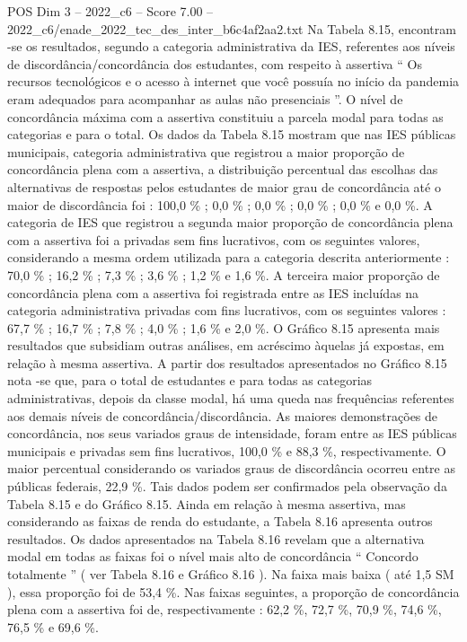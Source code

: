 \begin{textsample}{POS Dim 3 – 2022\_c6 – Score 7.00 – 2022\_c6/enade\_2022\_tec\_des\_inter\_b6c4af2aa2.txt}
Na Tabela 8.15, encontram -se os resultados, segundo a categoria administrativa da IES, referentes aos níveis de discordância/concordância dos estudantes, com respeito à assertiva “ Os recursos tecnológicos e o acesso à internet que você possuía no início da pandemia eram adequados para acompanhar as aulas não presenciais ”.
O nível de concordância máxima com a assertiva constituiu a parcela modal para todas as categorias e para o total.
Os dados da Tabela 8.15 mostram que nas IES públicas municipais, categoria administrativa que registrou a maior proporção de concordância plena com a assertiva, a distribuição percentual das escolhas das alternativas de respostas pelos estudantes de maior grau de concordância até o maior de discordância foi : 100,0 \% ; 0,0 \% ; 0,0 \% ; 0,0 \% ; 0,0 \% e 0,0 \%.
A categoria de IES que registrou a segunda maior proporção de concordância plena com a assertiva foi a privadas sem fins lucrativos, com os seguintes valores, considerando a mesma ordem utilizada para a categoria descrita anteriormente : 70,0 \% ; 16,2 \% ; 7,3 \% ; 3,6 \% ; 1,2 \% e 1,6 \%.
A terceira maior proporção de concordância plena com a assertiva foi registrada entre as IES incluídas na categoria administrativa privadas com fins lucrativos, com os seguintes valores : 67,7 \% ; 16,7 \% ; 7,8 \% ; 4,0 \% ; 1,6 \% e 2,0 \%.
O Gráfico 8.15 apresenta mais resultados que subsidiam outras análises, em acréscimo àquelas já expostas, em relação à mesma assertiva.
A partir dos resultados apresentados no Gráfico 8.15 nota -se que, para o total de estudantes e para todas as categorias administrativas, depois da classe modal, há uma queda nas frequências referentes aos demais níveis de concordância/discordância.
As maiores demonstrações de concordância, nos seus variados graus de intensidade, foram entre as IES públicas municipais e privadas sem fins lucrativos, 100,0 \% e 88,3 \%, respectivamente.
O maior percentual considerando os variados graus de discordância ocorreu entre as públicas federais, 22,9 \%.
Tais dados podem ser confirmados pela observação da Tabela 8.15 e do Gráfico 8.15.
Ainda em relação à mesma assertiva, mas considerando as faixas de renda do estudante, a Tabela 8.16 apresenta outros resultados.
Os dados apresentados na Tabela 8.16 revelam que a alternativa modal em todas as faixas foi o nível mais alto de concordância “ Concordo totalmente ” ( ver Tabela 8.16 e Gráfico 8.16 ).
Na faixa mais baixa ( até 1,5 SM ), essa proporção foi de 53,4 \%.
Nas faixas seguintes, a proporção de concordância plena com a assertiva foi de, respectivamente : 62,2 \%, 72,7 \%, 70,9 \%, 74,6 \%, 76,5 \% e 69,6 \%.

\end{textsample}
